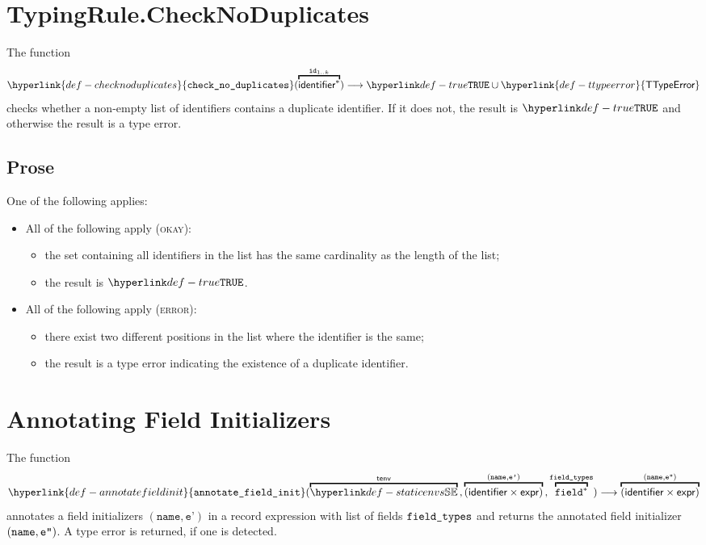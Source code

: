 \documentclass{book}
\newcommand\TypeError[0]{\hyperlink{def-typeerror}{\textsf{TypeError}}}
\newcommand\TypeErrorVal[1]{\TypeError(\texttt{"ERROR[#1]"})}
\newcommand\TTypeError[0]{\hyperlink{def-ttypeerror}{\textsf{TTypeError}}}
\newcommand\annotaterel[0]{\hyperlink{def-annotaterel}{\textsf{type}}}
\newcommand\typearrow[0]{\xrightarrow{\annotaterel}}
\newcommand\annotatefieldinit[0]{\hyperlink{def-annotatefieldinit}{\texttt{annotate\_field\_init}}}
\newcommand\checknoduplicates[0]{\hyperlink{def-checknoduplicates}{\texttt{check\_no\_duplicates}}}
\newcommand\vep[0]{\texttt{e'}}
\newcommand\name[0]{\texttt{name}}
\begin{document}
\hypertarget{def-checknoduplicates}{}
\section{TypingRule.CheckNoDuplicates \label{sec:TypingRule.CheckNoDuplicates}}
The function
\[
  \checknoduplicates(\overname{\identifier^*}{\id_{1..k}}) \aslto \True \cup \TTypeError
\]
checks whether a non-empty list of identifiers contains a duplicate identifier. If it does not, the result
is $\True$ and otherwise the result is a type error.

\subsection{Prose}
One of the following applies:
\begin{itemize}
  \item All of the following apply (\textsc{okay}):
  \begin{itemize}
    \item the set containing all identifiers in the list has the same cardinality as the length of the list;
    \item the result is $\True$.
  \end{itemize}

  \item All of the following apply (\textsc{error}):
  \begin{itemize}
    \item there exist two different positions in the list where the identifier is the same;
    \item the result is a type error indicating the existence of a duplicate identifier.
  \end{itemize}
\end{itemize}

\begin{emptyformal}
\end{emptyformal}

\hypertarget{def-annotatefieldinit}{}
\section{Annotating Field Initializers}
The function
\[
  \annotatefieldinit(
    \overname{\staticenvs}{\tenv} \aslsep
    \overname{(\identifier\times\expr)}{(\name, \vep)} \aslsep
    \overname{\field^*}{\fieldtypes}
  ) \aslto
  \overname{(\identifier\times\expr)}{(\name, \vepp)}
\]
annotates a field initializers $(\name, \vep)$ in a record expression
with list of fields $\texttt{field\_types}$ and returns the annotated field initializer
$(\name, \vepp)$. A type error is returned, if one is detected.
\end{document}
